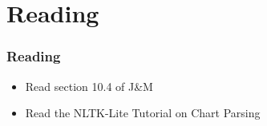 \section{Reading}


\begin{frame}[fragile]
  \frametitle{Reading}

{\large 
  \begin{itemize}
    
  \item Read section 10.4 of J\&M

  \item Read the NLTK-Lite Tutorial on Chart Parsing


  \end{itemize}

}


\end{frame}







